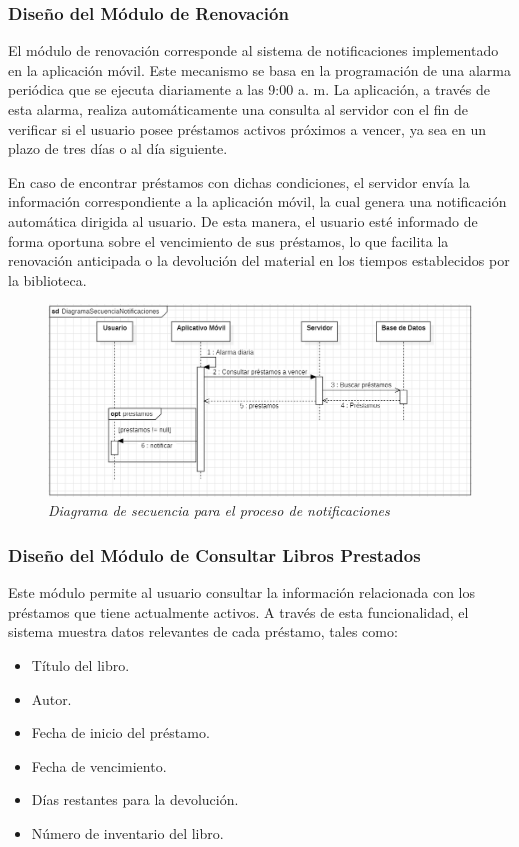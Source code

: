 \documentclass[spanish]{ieee_upb}
\begin{document}
\subsubsection{Diseño del Módulo de Renovación}


El módulo de renovación corresponde al sistema de notificaciones implementado en la aplicación móvil. Este mecanismo se basa en la programación de una alarma periódica que se ejecuta diariamente a las 9:00 a. m. La aplicación, a través de esta alarma, realiza automáticamente una consulta al servidor con el fin de verificar si el usuario posee préstamos activos próximos a vencer, ya sea en un plazo de tres días o al día siguiente.
\vspace{0.3 cm}

En caso de encontrar préstamos con dichas condiciones, el servidor envía la información correspondiente a la aplicación móvil, la cual genera una notificación automática dirigida al usuario. De esta manera, el usuario esté informado de forma oportuna sobre el vencimiento de sus préstamos, lo que facilita la renovación anticipada o la devolución del material en los tiempos establecidos por la biblioteca.

 \begin{figure}[H] 
	\centering
	\includegraphics[width=0.7\linewidth]{img/actividadNotificaciones.png}
	\vspace{-1mm}
	\caption[Diagrama de Secuencia Sistema de notificaciones]{\textit{Diagrama de secuencia para el proceso de notificaciones}}
	\label{fig:actividadesNotificaciones} 
\end{figure}

\subsubsection{Diseño del Módulo de Consultar Libros Prestados}
Este módulo permite al usuario consultar la información relacionada con los préstamos que tiene actualmente activos. A través de esta funcionalidad, el sistema muestra datos relevantes de cada préstamo, tales como:
\begin{itemize}
    \item Título del libro.
    \item Autor.
    \item Fecha de inicio del préstamo.
    \item Fecha de vencimiento.
    \item Días restantes para la devolución.
    \item Número de inventario del libro.
\end{itemize}
\end{document}
